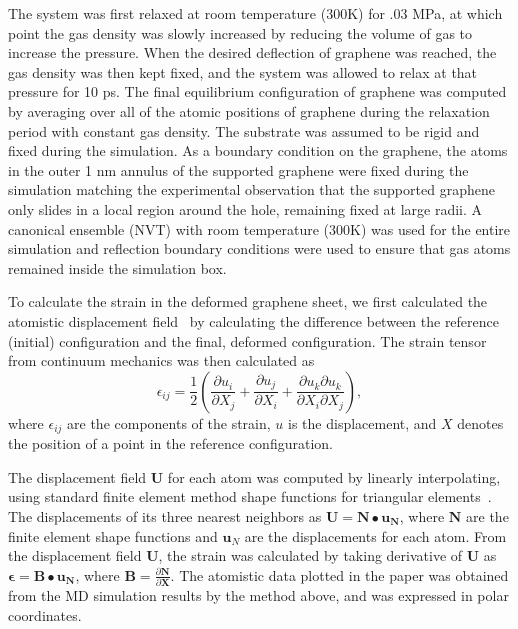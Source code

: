 The system was first relaxed at room temperature (300K) for .03 MPa, at which point the gas density was slowly increased by reducing the volume of gas to increase the pressure.
When the desired deflection of graphene was reached, the gas density was then kept fixed, and the system was allowed to relax at that pressure for 10 ps.
The final equilibrium configuration of graphene was computed by averaging over all of the atomic positions of graphene during the relaxation period with constant gas density.
The substrate was assumed to be rigid and fixed during the simulation.
As a boundary condition on the graphene, the atoms in the outer 1 nm annulus of the supported graphene were fixed during the simulation matching the experimental observation that the supported graphene only slides in a local region around the hole, remaining fixed at large radii.
A canonical ensemble (NVT) with room temperature (300K) was used for the entire simulation and reflection boundary conditions were used to ensure that gas atoms remained inside the simulation box.  

To calculate the strain in the deformed graphene sheet, we first calculated the atomistic displacement field~\cite{ZimmermanIJSS2009} by calculating the difference between the reference (initial) configuration and the final, deformed configuration.
The strain tensor from continuum mechanics was then calculated as
\begin{equation} \label{eq:fri:straindisp}
	\epsilon_{ij}=\frac{1}{2}\left(\frac{\partial {u_i}}{\partial {X_j}} + \frac{\partial {u_j}}{\partial {X_i}} + \frac{\partial{u_k}\partial{u_k}}{\partial{X_i}\partial{X_j}}\right),
\end{equation}
where $\epsilon_{ij}$ are the components of the strain, $u$ is the displacement, and $X$ denotes the position of a point in the reference configuration.

The displacement field $\mathbf{U}$ for each atom was computed by linearly interpolating, using standard finite element method shape functions for triangular elements~\cite{hughes1987}.
The displacements of its three nearest neighbors as $\mathbf{U}=\mathbf{N}\bullet\mathbf{u_N}$, where $\mathbf{N}$ are the finite element shape functions and $\mathbf{u}_{N}$ are the displacements for each atom.
From the displacement field $\mathbf{U}$, the strain was calculated by taking derivative of $\mathbf{U}$ as $\mathbf{\epsilon}=\mathbf{B}\bullet\mathbf{u_N}$, where $\mathbf{B}=\frac{\partial \mathbf{N}}{\partial \mathbf{X}}$.
The atomistic data plotted in the paper was obtained from the MD simulation results by the method above, and was expressed in polar coordinates. 


